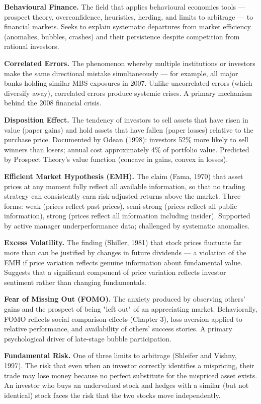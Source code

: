 \documentclass[12pt, letterpaper]{article}
\begin{document}
\textbf{Behavioural Finance.} The field that applies behavioural economics tools --- prospect theory, overconfidence, heuristics, herding, and limits to arbitrage --- to financial markets. Seeks to explain systematic departures from market efficiency (anomalies, bubbles, crashes) and their persistence despite competition from rational investors.

\textbf{Correlated Errors.} The phenomenon whereby multiple institutions or investors make the same directional mistake simultaneously --- for example, all major banks holding similar MBS exposures in 2007. Unlike uncorrelated errors (which diversify away), correlated errors produce systemic crises. A primary mechanism behind the 2008 financial crisis.

\textbf{Disposition Effect.} The tendency of investors to sell assets that have risen in value (paper gains) and hold assets that have fallen (paper losses) relative to the purchase price. Documented by Odean (1998): investors 52\% more likely to sell winners than losers; annual cost approximately 4\% of portfolio value. Predicted by Prospect Theory's value function (concave in gains, convex in losses).

\textbf{Efficient Market Hypothesis (EMH).} The claim (Fama, 1970) that asset prices at any moment fully reflect all available information, so that no trading strategy can consistently earn risk-adjusted returns above the market. Three forms: weak (prices reflect past prices), semi-strong (prices reflect all public information), strong (prices reflect all information including insider). Supported by active manager underperformance data; challenged by systematic anomalies.

\textbf{Excess Volatility.} The finding (Shiller, 1981) that stock prices fluctuate far more than can be justified by changes in future dividends --- a violation of the EMH if price variation reflects genuine information about fundamental value. Suggests that a significant component of price variation reflects investor sentiment rather than changing fundamentals.

\textbf{Fear of Missing Out (FOMO).} The anxiety produced by observing others' gains and the prospect of being "left out" of an appreciating market. Behaviorally, FOMO reflects social comparison effects (Chapter 3), loss aversion applied to relative performance, and availability of others' success stories. A primary psychological driver of late-stage bubble participation.

\textbf{Fundamental Risk.} One of three limits to arbitrage (Shleifer and Vishny, 1997). The risk that even when an investor correctly identifies a mispricing, their trade may lose money because no perfect substitute for the mispriced asset exists. An investor who buys an undervalued stock and hedges with a similar (but not identical) stock faces the risk that the two stocks move independently.
\end{document}

